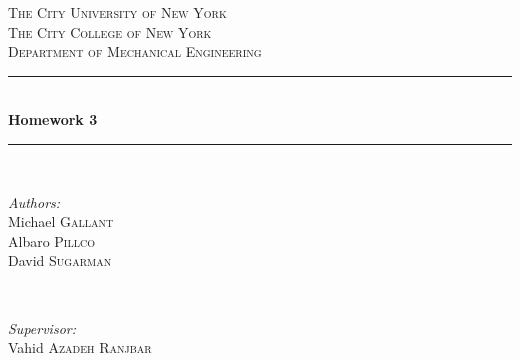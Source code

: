 \message{ !name(HW3.tex)}\documentclass[12pt,letterpaper,notitlepage]{article}
\begin{document}


\begin{titlepage}

\newcommand{\HRule}{\rule{\linewidth}{0.5mm}} %

\center %


\textsc{\LARGE The City University of New York}\\[1cm] %
\textsc{\Large The City College of New York}\\[0.5cm] %
\textsc{\large Department of Mechanical Engineering}\\[0.5cm] %


\HRule \\[0.4cm]
{ \huge \bfseries Homework 3}\\[0.4cm] %
\HRule \\[1.5cm]


\begin{minipage}{0.4\textwidth}
\begin{flushleft} \large
\emph{Authors:}\\
Michael \textsc{Gallant}\\
Albaro \textsc{Pillco}\\
David \textsc{Sugarman}\\
\end{flushleft}
\end{minipage}
~
\begin{minipage}{0.4\textwidth}
\begin{flushright} \large
\emph{Supervisor:} \\
Vahid \textsc{Azadeh Ranjbar} %
\end{flushright}
\end{minipage}\\[2cm]


\end{titlepage}
\end{document}
